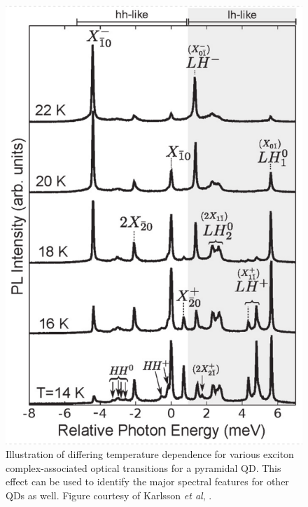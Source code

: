 \documentclass[12pt]{article}
\begin{document}
\begin{figure}
\begin{center}
\includegraphics[scale=0.6]{figures/temperature_dependence}
\end{center}
\caption{Illustration of differing temperature dependence for various exciton complex-associated optical transitions for a pyramidal QD. This effect can be used to identify the major spectral features for other QDs as well. Figure courtesy of Karlsson \textit{et al}, \cite{karlsson}.}
\end{figure}
\end{document}
